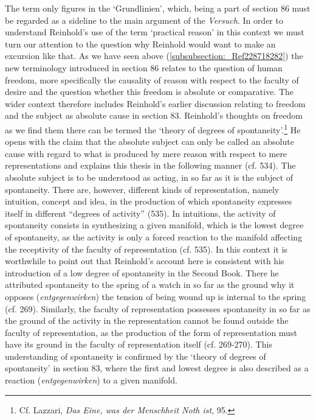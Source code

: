 The term only figures in the `Grundlinien', which, being a part of section 86 must be regarded as a sideline to the main argument of the \textit{Versuch}. In order to understand Reinhold's use of the term `practical reason' in this context we must turn our attention to the question why Reinhold would want to make an excursion like that. As we have seen above (\ref{subsubsection:_Ref228718282}) the new terminology introduced in section 86 relates to the question of human freedom, more specifically the causality of reason with respect to the faculty of desire and the question whether this freedom is absolute or comparative. The wider context therefore includes Reinhold's earlier discussion relating to freedom and the subject as absolute cause in section 83. Reinhold's thoughts on freedom as we find them there can be termed the `theory of degrees of spontaneity'.\footnote{ Cf. Lazzari, \textit{Das Eine, was der Menschheit Noth ist}, 95. } He opens with the claim that the absolute subject can only be called an absolute cause with regard to what is produced by mere reason with respect to mere representations and explains this thesis in the following manner (cf. 534). The absolute subject is to be understood as acting, in so far as it is the subject of spontaneity. There are, however, different kinds of representation, namely intuition, concept and idea, in the production of which spontaneity expresses itself in different ``degrees of activity'' (535). In intuitions, the activity of spontaneity consists in synthesizing a given manifold, which is the lowest degree of spontaneity, as the activity is only a forced reaction to the manifold affecting the receptivity of the faculty of representation (cf. 535). In this context it is worthwhile to point out that Reinhold's account here is consistent with his introduction of a low degree of spontaneity in the Second Book. There he attributed spontaneity to the spring of a watch in so far as the ground why it opposes (\textit{entgegenwirken}) the tension of being wound up is internal to the spring (cf. 269). Similarly, the faculty of representation possesses spontaneity in so far as the ground of the activity in the representation cannot be found outside the faculty of representation, as the production of the form of representation must have its ground in the faculty of representation itself (cf. 269{-}270). This understanding of spontaneity is confirmed by the `theory of degrees of spontaneity' in section 83, where the first and lowest degree is also described as a reaction (\textit{entgegenwirken}) to a given manifold. 

